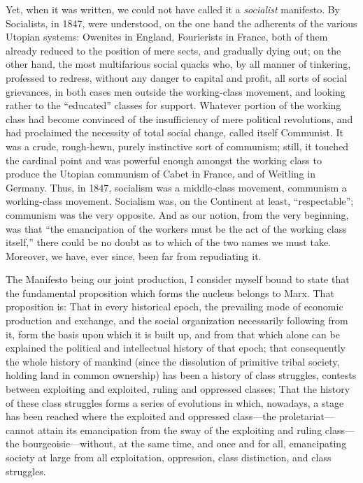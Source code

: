 Yet, when it was written, we could not have called it a \emph{socialist} manifesto. By Socialists, in 1847, were understood, on the one hand the adherents of the various Utopian systems: Owenites in England, Fourierists in France, both of them already reduced to the position of mere sects, and gradually dying out; on the other hand, the most multifarious social quacks who, by all manner of tinkering, professed to redress, without any danger to capital and profit, all sorts of social grievances, in both cases men outside the working-class movement, and looking rather to the ``educated'' classes for support. Whatever portion of the working class had become convinced of the insufficiency of mere political revolutions, and had proclaimed the necessity of total social change, called itself Communist. It was a crude, rough-hewn, purely instinctive sort of communism; still, it touched the cardinal point and was powerful enough amongst the working class to produce the Utopian communism of Cabet in France, and of Weitling in Germany. Thus, in 1847, socialism was a middle-class movement, communism a working-class movement. Socialism was, on the Continent at least, ``respectable''; communism was the very opposite. And as our notion, from the very beginning, was that ``the emancipation of the workers must be the act of the working class itself,'' there could be no doubt as to which of the two names we must take. Moreover, we have, ever since, been far from repudiating it. 

The Manifesto being our joint production, I consider myself bound to state that the fundamental proposition which forms the nucleus belongs to Marx. That proposition is: That in every historical epoch, the prevailing mode of economic production and exchange, and the social organization necessarily following from it, form the basis upon which it is built up, and from that which alone can be explained the political and intellectual history of that epoch; that consequently the whole history of mankind (since the dissolution of primitive tribal society, holding land in common ownership) has been a history of class struggles, contests between exploiting and exploited, ruling and oppressed classes; That the history of these class struggles forms a series of evolutions in which, nowadays, a stage has been reached where the exploited and oppressed class---the proletariat---cannot attain its emancipation from the sway of the exploiting and ruling class---the bourgeoisie---without, at the same time, and once and for all, emancipating society at large from all exploitation, oppression, class distinction, and class struggles. 

